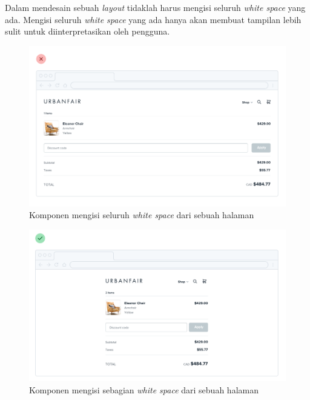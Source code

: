 Dalam mendesain sebuah \textit{layout} tidaklah harus mengisi seluruh \textit{white space} yang ada. Mengisi seluruh \textit{white space} yang ada hanya akan membuat tampilan lebih sulit untuk diinterpretasikan oleh pengguna.

\begin{figure}[H]
	\centering
	\includegraphics[keepaspectratio, width=12cm]{gambar/g-117.png}
	\caption{Komponen mengisi seluruh \textit{white space} dari sebuah halaman \citep{refactoringui}}
	\label{gambar:g-117.png}
\end{figure}

\begin{figure}[H]
	\centering
	\includegraphics[keepaspectratio, width=14cm]{gambar/g-118.png}
	\caption{Komponen mengisi sebagian \textit{white space} dari sebuah halaman \citep{refactoringui}}
	\label{gambar:g-118.png}
\end{figure}

